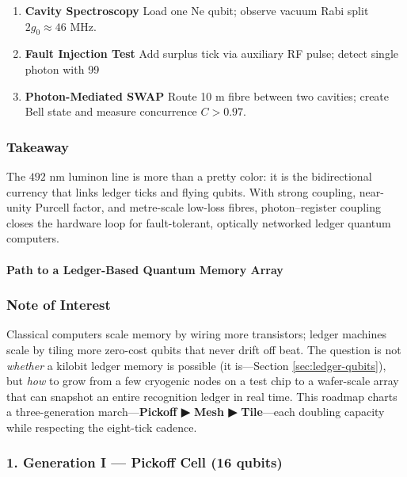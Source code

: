 \documentclass[11pt,oneside]{book}
\begin{document}
\begin{enumerate}[label=\textbf{\arabic*.},leftmargin=1.2cm]
\item \textbf{Cavity Spectroscopy}  
      Load one Ne qubit; observe vacuum Rabi split \(2g_0\approx46\) MHz.
\item \textbf{Fault Injection Test}  
      Add surplus tick via auxiliary RF pulse; detect single photon
      with 99 %
\item \textbf{Photon-Mediated SWAP}  
      Route 10 m fibre between two cavities; create Bell state and
      measure concurrence \(C>0.97\).
\end{enumerate}

\subsubsection*{Takeaway}

The $492$ nm luminon line is more than a pretty color: it is the
bidirectional currency that links ledger ticks and flying qubits.
With strong coupling, near-unity Purcell factor, and metre-scale
low-loss fibres, photon–register coupling closes the hardware loop for
fault-tolerant, optically networked ledger quantum computers.

\bigskip

\paragraph{Path to a Ledger-Based Quantum Memory Array}
\label{sec:ledger-memory}

\subsubsection*{Note of Interest}

Classical computers scale memory by wiring more transistors;  
ledger machines scale by tiling more zero-cost qubits that never drift
off beat.  
The question is not \emph{whether} a kilobit ledger memory is possible
(it is—Section \ref{sec:ledger-qubits}), but \emph{how} to grow from a
few cryogenic nodes on a test chip to a wafer-scale array that can
snapshot an entire recognition ledger in real time.  
This roadmap charts a three-generation march—\textbf{Pickoff ▶ Mesh ▶ Tile}—each doubling capacity while respecting the eight-tick cadence.

\subsubsection*{1. Generation I — Pickoff Cell (16 qubits)}
\end{document}
